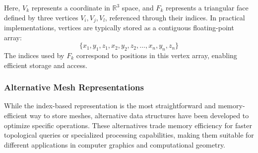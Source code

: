 Here, \( V_k \) represents a coordinate in \( \mathbb{R}^3 \) space, and \( F_k \) represents a triangular face defined by three vertices \( V_i, V_j, V_l \), referenced through their indices. In practical implementations, vertices are typically stored as a contiguous floating-point array:
\[
\{x_1, y_1, z_1, x_2, y_2, z_2, \dots, x_n, y_n, z_n\}
\]
The indices used by \( F_k \) correspond to positions in this vertex array, enabling efficient storage and access.

\subsubsection*{Alternative Mesh Representations}

While the index-based representation is the most straightforward and memory-efficient way to store meshes, alternative data structures have been developed to optimize specific operations. These alternatives trade memory efficiency for faster topological queries or specialized processing capabilities, making them suitable for different applications in computer graphics and computational geometry.

